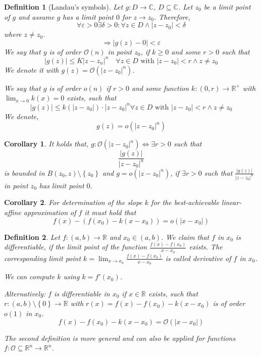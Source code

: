 \documentclass[a4paper,landscape,twocolumn]{article}
\newtheorem{defi}{Definition}
\newtheorem{cor}{Corollary}
\newcommand\set[1]{\left\{#1\right\}}
\newcommand\abs[1]{\left|#1\right|}
\begin{document}
\begin{defi}[Landau's symbols]
  Let $g: D \to \mathbb C$, $D \subseteq \mathbb C$.
  Let $z_0$ be a limit point of $g$ and assume $g$ has a limit point $0$ for $z \to z_0$.
  Therefore,
  \[ \forall \varepsilon > 0 \exists \delta > 0: \forall z \in D \land \abs{z - z_0} < \delta \]
  where $z \neq z_0$.
  \[ \Rightarrow \abs{g(z) - 0} < \varepsilon \]
  We say that $y$ is \emph{of order $\mathcal{O}(n)$} in point $z_0$,
  if $k \geq 0$ and some $r > 0$ such that
  \[ \abs{g(z)} \leq K \abs{z - z_n}^n \quad\forall z \in D \text{ with } \abs{z - z_0} < r \land z \neq z_0 \]
  We denote it with $g(z) = \mathcal O(\abs{z - z_0}^n)$.

  We say that $g$ is of order $o(n)$ if $r > 0$ and some function $k: (0, r) \to \mathbb R^+$
  with $\lim_{x\to 0} k(x) = 0$ exists, such that
  \[
    \abs{g(z)} \leq k(\abs{z - z_0}) \cdot \abs{z - z_0}^n
    \forall z \in D \text{ with } \abs{z - z_0} < r \land z \neq z_0
  \]
  We denote,
  \[ g(z) = o(\abs{z - z_0}^n) \]
\end{defi}
\begin{cor}
  It holds that,
  $g: \mathcal O(\abs{z - z_0}^n) \Leftrightarrow \exists r > 0$ such that
  \[ \frac{\abs{g(z)}}{\abs{z - z_0}^n} \]
  is bounded in $B(z_0, z) \setminus \set{z_0}$ and $g = o(\abs{z - z_0}^n)$,
  if $\exists r > 0$ such that $\frac{\abs{g(z)}}{\abs{z - z_0}^n}$ in point
  $z_0$ has limit point $0$.
\end{cor}
\begin{cor}
  For determination of the slope $k$ for the best-achievable linear-affine approximation
  of $f$ it must hold that
  \[ f(x) - (f(x_0) - k (x - x_0)) = o(\abs{x - x_0}) \]
\end{cor}
\begin{defi}
  Let $f: (a, b) \to \mathbb R$ and $x_0 \in (a, b)$. We claim that $f$ in $x_0$
  is \emph{differentiable}, if the limit point of the function $\frac{f(x) - f(x_0)}{x - x_0}$
  exists. The corresponding limit point $k = \lim_{x\to x_0} \frac{f(x) - f(x_0)}{x - x_0}$
  is called \emph{derivative of $f$ in $x_0$}.

  We can compute $k$ using $k = f'(x_0)$.

  Alternatively: $f$ is differentiable in $x_0$ if $x \in \mathbb R$ exists,
  such that
  $r: (a, b) \setminus \set{0} \to \mathbb R$
  with
  $r(x)  = f(x) - f(x_0) - k(x - x_0)$
  is of order $o(1)$ in $x_0$.
  \[ f(x) - f(x_0) - k(x - x_0) = \mathcal O(\abs{x - x_0}) \]

  The second definition is more general and can also be applied for functions
  $f: \mathcal O \subseteq \mathbb R^n \to \mathbb R^n$.
\end{defi}
\end{document}
